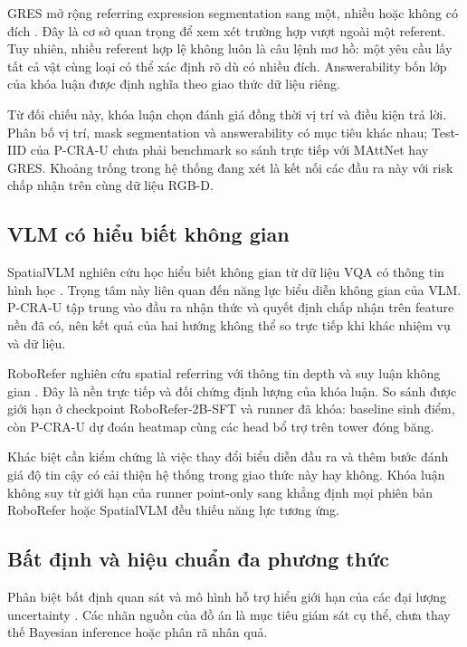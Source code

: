 GRES mở rộng referring expression segmentation sang một, nhiều hoặc không có đích \cite{liu2023gres}. Đây là cơ sở quan trọng để xem xét trường hợp vượt ngoài một referent. Tuy nhiên, nhiều referent hợp lệ không luôn là câu lệnh mơ hồ: một yêu cầu lấy tất cả vật cùng loại có thể xác định rõ dù có nhiều đích. Answerability bốn lớp của khóa luận được định nghĩa theo giao thức dữ liệu riêng.

Từ đối chiếu này, khóa luận chọn đánh giá đồng thời vị trí và điều kiện trả lời. Phân bố vị trí, mask segmentation và answerability có mục tiêu khác nhau; Test-IID của P-CRA-U chưa phải benchmark so sánh trực tiếp với MAttNet hay GRES. Khoảng trống trong hệ thống đang xét là kết nối các đầu ra này với risk chấp nhận trên cùng dữ liệu RGB-D.

\subsection{VLM có hiểu biết không gian}

SpatialVLM nghiên cứu học hiểu biết không gian từ dữ liệu VQA có thông tin hình học \cite{chen2024spatialvlm}. Trọng tâm này liên quan đến năng lực biểu diễn không gian của VLM. P-CRA-U tập trung vào đầu ra nhận thức và quyết định chấp nhận trên feature nền đã có, nên kết quả của hai hướng không thể so trực tiếp khi khác nhiệm vụ và dữ liệu.

RoboRefer nghiên cứu spatial referring với thông tin depth và suy luận không gian \cite{zhou2025roborefer}. Đây là nền trực tiếp và đối chứng định lượng của khóa luận. So sánh được giới hạn ở checkpoint RoboRefer-2B-SFT và runner đã khóa: baseline sinh điểm, còn P-CRA-U dự đoán heatmap cùng các head bổ trợ trên tower đóng băng.

Khác biệt cần kiểm chứng là việc thay đổi biểu diễn đầu ra và thêm bước đánh giá độ tin cậy có cải thiện hệ thống trong giao thức này hay không. Khóa luận không suy từ giới hạn của runner point-only sang khẳng định mọi phiên bản RoboRefer hoặc SpatialVLM đều thiếu năng lực tương ứng.

\subsection{Bất định và hiệu chuẩn đa phương thức}

Phân biệt bất định quan sát và mô hình hỗ trợ hiểu giới hạn của các đại lượng uncertainty \cite{kendall2017uncertainties}. Các nhãn nguồn của đồ án là mục tiêu giám sát cụ thể, chưa thay thế Bayesian inference hoặc phân rã nhân quả.

